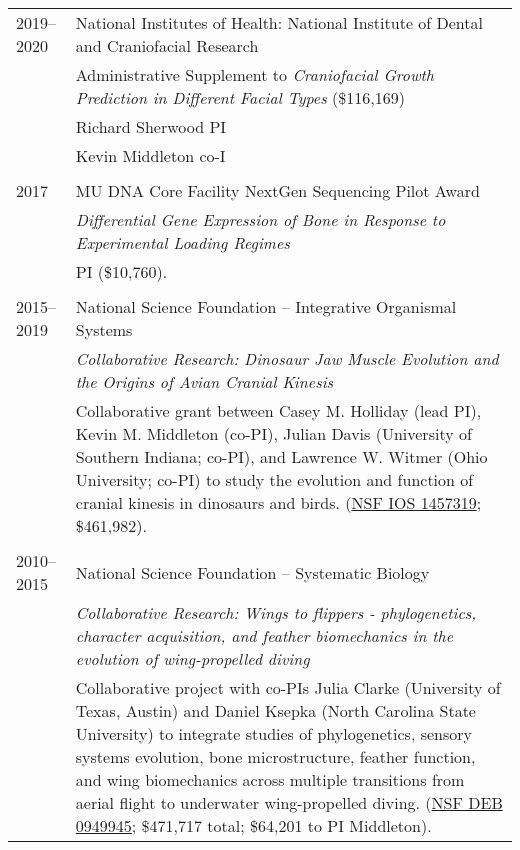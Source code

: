 \begin{longtable}{@{}lX@{}}
    2019--2020 & National Institutes of Health: National Institute of Dental and Craniofacial Research\\
         & Administrative Supplement to \emph{Craniofacial Growth Prediction in Different Facial Types} (\$116,169)\\
         & Richard Sherwood PI\\
         & Kevin Middleton co-I\\
         \\
    2017 & MU DNA Core Facility NextGen Sequencing Pilot Award\\
    & \emph{Differential Gene Expression of Bone in Response to Experimental Loading Regimes}\\
    & PI (\$10,760).\\
    \\
    2015--2019 & National Science Foundation -- Integrative Organismal Systems\\
    & \emph{Collaborative Research: Dinosaur Jaw Muscle Evolution and the Origins of Avian Cranial Kinesis}\\[0.5pc]
    & Collaborative grant between Casey M. Holliday (lead PI), Kevin M. Middleton (co-PI), Julian Davis (University of Southern Indiana; co-PI), and Lawrence W. Witmer (Ohio University; co-PI) to study the evolution and function of cranial kinesis in dinosaurs and birds. (\href{https://www.nsf.gov/awardsearch/showAward?AWD_ID=1457319}{NSF IOS 1457319}; \$461,982).\\
    \\
    2010--2015 & National Science Foundation -- Systematic Biology\\
    & \textit{Collaborative Research: Wings to flippers - phylogenetics, character acquisition, and feather biomechanics in the evolution of wing-propelled diving}\\[0.5pc]
    & Collaborative project with co-PIs Julia Clarke (University of Texas, Austin) and Daniel Ksepka (North Carolina State University) to integrate studies of phylogenetics, sensory systems evolution, bone microstructure, feather function, and wing biomechanics across multiple transitions from aerial flight to underwater wing-propelled diving. (\href{http://www.nsf.gov/awardsearch/showAward.do?AwardNumber=0949945}{NSF DEB 0949945}; \$471,717 total; \$64,201 to PI Middleton).\\

\end{longtable}

